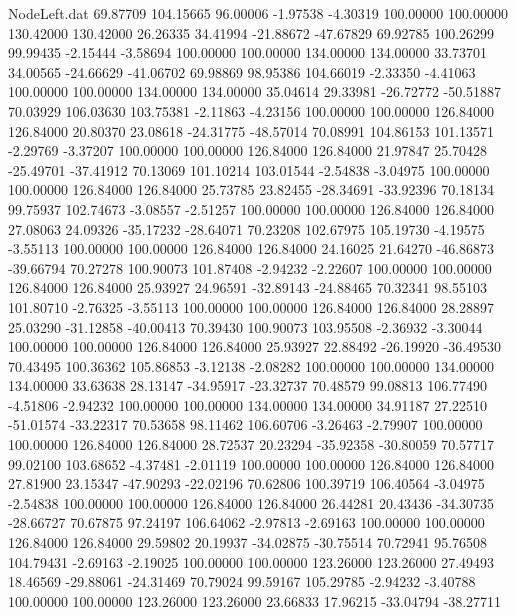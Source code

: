\begin{filecontents}{NodeLeft.dat}
  69.87709  104.15665   96.00006    -1.97538   -4.30319  100.00000  100.00000  130.42000  130.42000   26.26335   34.41994  -21.88672  -47.67829
  69.92785  100.26299   99.99435    -2.15444   -3.58694  100.00000  100.00000  134.00000  134.00000   33.73701   34.00565  -24.66629  -41.06702
  69.98869   98.95386  104.66019    -2.33350   -4.41063  100.00000  100.00000  134.00000  134.00000   35.04614   29.33981  -26.72772  -50.51887
  70.03929  106.03630  103.75381    -2.11863   -4.23156  100.00000  100.00000  126.84000  126.84000   20.80370   23.08618  -24.31775  -48.57014
  70.08991  104.86153  101.13571    -2.29769   -3.37207  100.00000  100.00000  126.84000  126.84000   21.97847   25.70428  -25.49701  -37.41912
  70.13069  101.10214  103.01544    -2.54838   -3.04975  100.00000  100.00000  126.84000  126.84000   25.73785   23.82455  -28.34691  -33.92396
  70.18134   99.75937  102.74673    -3.08557   -2.51257  100.00000  100.00000  126.84000  126.84000   27.08063   24.09326  -35.17232  -28.64071
  70.23208  102.67975  105.19730    -4.19575   -3.55113  100.00000  100.00000  126.84000  126.84000   24.16025   21.64270  -46.86873  -39.66794
  70.27278  100.90073  101.87408    -2.94232   -2.22607  100.00000  100.00000  126.84000  126.84000   25.93927   24.96591  -32.89143  -24.88465
  70.32341   98.55103  101.80710    -2.76325   -3.55113  100.00000  100.00000  126.84000  126.84000   28.28897   25.03290  -31.12858  -40.00413
  70.39430  100.90073  103.95508    -2.36932   -3.30044  100.00000  100.00000  126.84000  126.84000   25.93927   22.88492  -26.19920  -36.49530
  70.43495  100.36362  105.86853    -3.12138   -2.08282  100.00000  100.00000  134.00000  134.00000   33.63638   28.13147  -34.95917  -23.32737
  70.48579   99.08813  106.77490    -4.51806   -2.94232  100.00000  100.00000  134.00000  134.00000   34.91187   27.22510  -51.01574  -33.22317
  70.53658   98.11462  106.60706    -3.26463   -2.79907  100.00000  100.00000  126.84000  126.84000   28.72537   20.23294  -35.92358  -30.80059
  70.57717   99.02100  103.68652    -4.37481   -2.01119  100.00000  100.00000  126.84000  126.84000   27.81900   23.15347  -47.90293  -22.02196
  70.62806  100.39719  106.40564    -3.04975   -2.54838  100.00000  100.00000  126.84000  126.84000   26.44281   20.43436  -34.30735  -28.66727
  70.67875   97.24197  106.64062    -2.97813   -2.69163  100.00000  100.00000  126.84000  126.84000   29.59802   20.19937  -34.02875  -30.75514
  70.72941   95.76508  104.79431    -2.69163   -2.19025  100.00000  100.00000  123.26000  123.26000   27.49493   18.46569  -29.88061  -24.31469
  70.79024   99.59167  105.29785    -2.94232   -3.40788  100.00000  100.00000  123.26000  123.26000   23.66833   17.96215  -33.04794  -38.27711

\end{filecontents}
